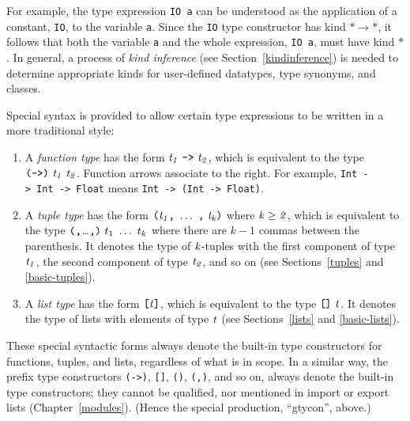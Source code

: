 For example, the type expression \mbox{\tt IO\ a} can be understood as the application
of a constant, \mbox{\tt IO}, to the variable \mbox{\tt a}.  Since the \mbox{\tt IO} type
constructor has kind 
$\ast\rightarrow\ast$, it follows that both the variable \mbox{\tt a} and the whole
expression, \mbox{\tt IO\ a}, must have kind $\ast$.
In general, a process of {\em kind inference}
(see Section~\ref{kindinference})
is needed to determine appropriate kinds for user-defined datatypes, type
synonyms, and classes.

Special syntax is provided to allow certain type expressions to be written
in a more traditional style:\nopagebreak[4]
\begin{enumerate}

\item A {\em function type} has the form
\mbox{$\it t_1\ \makebox{\tt ->}\ t_2$}, which is equivalent to the type
\mbox{$\it \makebox{\tt (->)}\ t_1\ t_2$}.  Function arrows associate to the right.
For example, \mbox{\tt Int\ ->\ Int\ ->\ Float} means \mbox{\tt Int\ ->\ (Int\ ->\ Float)}.

\item A {\em tuple type} has the form 
\mbox{$\it \makebox{\tt (}t_1\makebox{\tt ,}\ \ldots \ \makebox{\tt ,}\ t_k\makebox{\tt )}$} where \mbox{$\it k\geq 2$}, which is equivalent to
the type \mbox{$\it \makebox{\tt (,}$\ldots$\makebox{\tt ,)}\ t_1\ \ldots \ t_k$} where there are
$k-1$ commas between the parenthesis.  It denotes the
type of \mbox{$\it k$}-tuples with the first component of type \mbox{$\it t_1$}, the second
component of type \mbox{$\it t_2$}, and so on (see Sections~\ref{tuples}
and \ref{basic-tuples}).

\item A {\em list type} has the form \mbox{$\it \makebox{\tt [}t\makebox{\tt ]}$},
which is equivalent to the type \mbox{$\it \makebox{\tt []}\ t$}.
It denotes the type of lists with elements of type \mbox{$\it t$} (see
Sections~\ref{lists} and \ref{basic-lists}).

\end{enumerate}
These special syntactic forms always denote the built-in type constructors
for functions, tuples, and lists, regardless of what is in scope.
In a similar way, the prefix type constructors \mbox{\tt (->)}, \mbox{\tt []}, \mbox{\tt ()}, \mbox{\tt (,)}, 
and so on, always denote the built-in type constructors; they 
cannot be qualified, nor mentioned in import or export lists (Chapter~\ref{modules}).
(Hence the special production, ``gtycon'', above.)

